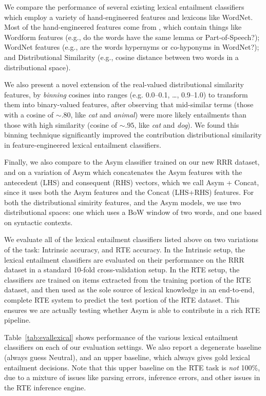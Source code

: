 \documentclass[12pt]{article}
\begin{document}
We compare the performance of several existing lexical entailment
classifiers which employ a variety of hand-engineered features and lexicons
like WordNet.  Most of the hand-engineered features come from
, which contain things like Wordform features (e.g.,
do the words have the same lemma or Part-of-Speech?); WordNet features (e.g.,
are the words hypernyms or co-hyponyms in WordNet?); and Distributional
Similarity (e.g., cosine distance between two words in a distributional space).

We also present a novel extension of the real-valued distributional similarity
features, by {\em binning} cosines into ranges (e.g. 0.0--0.1, \ldots, 0.9--1.0)
to transform them into binary-valued features, after observing that
mid-similar terms (those with a cosine of $\sim.80$, like {\em cat} and {\em
animal}) were more likely entailments than those with high similarity
(cosine of $\sim.95$, like {\em cat} and {\em dog}). We found this binning
technique significantly improved the contribution distributional similarity
in feature-engineered lexical entailment classifiers.

Finally, we also compare to the Asym classifier trained on our new RRR dataset,
and on a variation of Asym which concatenates the Asym features with the
antecedent (LHS) and consequent (RHS) vectors, which we call Asym + Concat,
since it uses both the Asym features and the Concat (LHS+RHS) features. For
both the distributional simirity features, and the Asym models, we use two
distributional spaces: one which uses a BoW window of two words, and one based
on syntactic contexts.

We evaluate all of the lexical entailment classifiers listed above on two
variations of the task: Intrinsic accuracy, and RTE accuracy. In the Intrinsic
setup, the lexical entailment classifiers are evaluated on their performance on
the RRR dataset in a standard 10-fold cross-validation setup. In the RTE setup,
the classifiers are trained on items extracted from the training portion of the
RTE dataset, and then used as the sole source of lexical knowledge in an
end-to-end, complete RTE system 
to predict the test portion of the RTE dataset. This ensures we are actually
testing whether Asym is able to contribute in a rich RTE pipeline.

Table~\ref{tab:evallexical} shows performance of the various lexical entailment
classifiers on each of our evaluation settings. We also report a degenerate
baseline (always guess Neutral), and an upper baseline, which always gives gold
lexical entailment decisions. Note that this upper baseline on the RTE
task is {\em not} 100\%, due to a mixture of issues like parsing errors,
inference errors, and other issues in the RTE inference engine.
\end{document}
